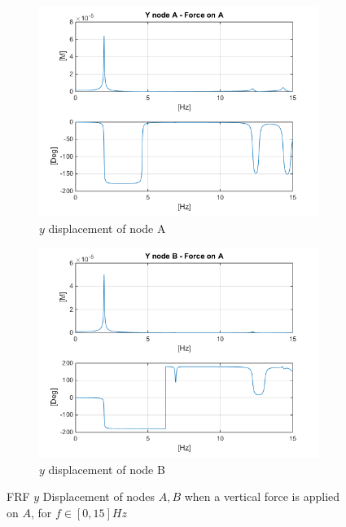 \documentclass[10pt,a4paper,final]{report}
\begin{document}
\begin{figure}[h]
        \centering
        \begin{subfigure}[t]{0.5\textwidth}
                \includegraphics[width=\textwidth]{bode1}
                \caption{$y$ displacement of node A}
                \label{fig:bode1}
        \end{subfigure}%
        \begin{subfigure}[t]{0.5\textwidth}
                \includegraphics[width=\textwidth]{bode2}
                \caption{$y$ displacement of node B}
                \label{fig:bode2}
        \end{subfigure}
        \caption{FRF $y$ Displacement of nodes $A,B$ when a vertical force is applied on $A$, for $f \in [0,15]Hz$} \label{fig:bodes1}
\end{figure}\\
\end{document}
